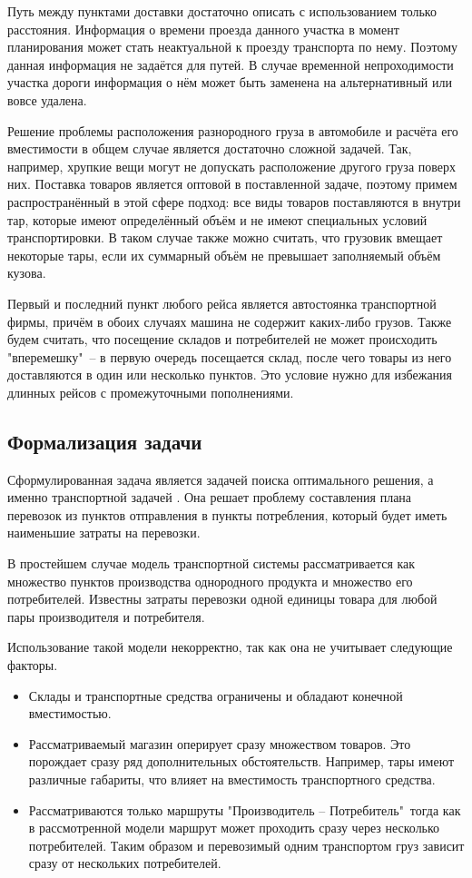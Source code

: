 	Путь между пунктами доставки достаточно описать с использованием только расстояния. Информация о времени проезда данного участка в момент планирования может стать неактуальной к проезду транспорта по нему. Поэтому данная информация не задаётся для путей. В случае временной непроходимости участка дороги информация о нём может быть заменена на альтернативный или вовсе удалена.
	
	Решение проблемы расположения разнородного груза в автомобиле и расчёта его вместимости в общем случае является достаточно сложной задачей. Так, например, хрупкие вещи могут не допускать расположение другого груза поверх них. Поставка товаров является оптовой в поставленной задаче, поэтому примем распространённый в этой сфере подход: все виды товаров поставляются в внутри тар, которые имеют определённый объём и не имеют специальных условий транспортировки. В таком случае также можно считать, что грузовик вмещает некоторые тары, если их суммарный объём не превышает заполняемый объём кузова.
	
	Первый и последний пункт любого рейса является автостоянка транспортной фирмы, причём в обоих случаях машина не содержит каких-либо грузов. Также будем считать, что посещение складов и потребителей не может происходить "вперемешку"\ -- в первую очередь посещается склад, после чего товары из него доставляются в один или несколько пунктов. Это условие нужно для избежания длинных рейсов с промежуточными пополнениями.

\subsection{Формализация задачи}
	Сформулированная задача является задачей поиска оптимального решения, а именно транспортной задачей \cite{trans:main}. Она решает проблему составления плана перевозок из пунктов отправления в пункты потребления, который будет иметь наименьшие затраты на перевозки. 
	
	В простейшем случае модель транспортной системы рассматривается как множество пунктов производства однородного продукта и множество его потребителей. Известны затраты перевозки одной единицы товара для любой пары производителя и потребителя.
	
	Использование такой модели некорректно, так как она не учитывает следующие факторы.
	\begin{itemize}
		\item Склады и транспортные средства ограничены и обладают конечной вместимостью.
		\item Рассматриваемый магазин оперирует сразу множеством товаров. Это порождает сразу ряд дополнительных обстоятельств. Например, тары имеют различные габариты, что влияет на вместимость транспортного средства.
		\item Рассматриваются только маршруты "Производитель -- Потребитель"\, тогда как в рассмотренной модели маршрут может проходить сразу через несколько потребителей. Таким образом и перевозимый одним транспортом груз зависит сразу от нескольких потребителей.
	\end{itemize}
		
